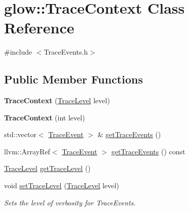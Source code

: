 \hypertarget{classglow_1_1_trace_context}{}\section{glow\+:\+:Trace\+Context Class Reference}
\label{classglow_1_1_trace_context}


{\ttfamily \#include $<$Trace\+Events.\+h$>$}

\subsection*{Public Member Functions}
\begin{DoxyCompactItemize}
\item 
\mbox{\label{classglow_1_1_trace_context_a8b1f102152d13b9d85388cdaed2d4e15}} 
{\bfseries Trace\+Context} (\hyperlink{structglow_1_1_trace_event_a10132a384d74408a112510cbe1b7d978}{Trace\+Level} level)
\item 
\mbox{\label{classglow_1_1_trace_context_a28016f401b06729a28d43d611708f570}} 
{\bfseries Trace\+Context} (int level)
\item 
std\+::vector$<$ \hyperlink{structglow_1_1_trace_event}{Trace\+Event} $>$ \& \hyperlink{classglow_1_1_trace_context_ac70c1c3538abbb536854e37ce1b37537}{get\+Trace\+Events} ()
\item 
llvm\+::\+Array\+Ref$<$ \hyperlink{structglow_1_1_trace_event}{Trace\+Event} $>$ \hyperlink{classglow_1_1_trace_context_ab0bb924d7e2cdc2f0097959f4e5cfb3f}{get\+Trace\+Events} () const
\item 
\hyperlink{structglow_1_1_trace_event_a10132a384d74408a112510cbe1b7d978}{Trace\+Level} \hyperlink{classglow_1_1_trace_context_aa1f486de9cc4c4d535900eb6054b8634}{get\+Trace\+Level} ()
\item 
\mbox{\label{classglow_1_1_trace_context_ab5de52a61d170850aaae5f3470598dab}} 
void \hyperlink{classglow_1_1_trace_context_ab5de52a61d170850aaae5f3470598dab}{set\+Trace\+Level} (\hyperlink{structglow_1_1_trace_event_a10132a384d74408a112510cbe1b7d978}{Trace\+Level} level)
\begin{DoxyCompactList}\small\item\em Sets the level of verbosity for Trace\+Events. \end{DoxyCompactList}\item 

\end{DoxyCompactItemize}
